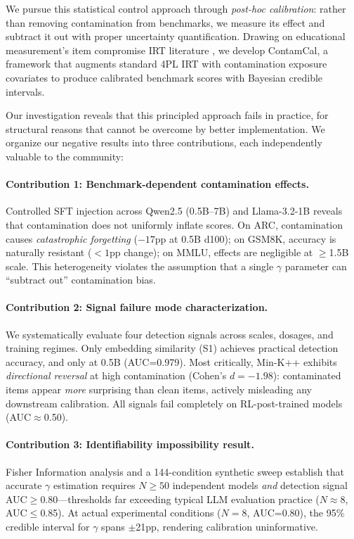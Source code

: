 \documentclass[11pt,a4paper]{article}
\begin{document}
We pursue this statistical control approach through \emph{post-hoc calibration}: rather than removing contamination from benchmarks, we measure its effect and subtract it out with proper uncertainty quantification.
Drawing on educational measurement's item compromise IRT literature \cite{eckerly2017detecting,sinharay2017assessing}, we develop ContamCal, a framework that augments standard 4PL IRT with contamination exposure covariates to produce calibrated benchmark scores with Bayesian credible intervals.

Our investigation reveals that this principled approach fails in practice, for structural reasons that cannot be overcome by better implementation.
We organize our negative results into three contributions, each independently valuable to the community:

\paragraph{Contribution 1: Benchmark-dependent contamination effects.}
Controlled SFT injection across Qwen2.5 (0.5B--7B) and Llama-3.2-1B reveals that contamination does not uniformly inflate scores.
On ARC, contamination causes \emph{catastrophic forgetting} ($-17$pp at 0.5B d100); on GSM8K, accuracy is naturally resistant ($<1$pp change); on MMLU, effects are negligible at $\geq$1.5B scale.
This heterogeneity violates the assumption that a single $\gamma$ parameter can ``subtract out'' contamination bias.

\paragraph{Contribution 2: Signal failure mode characterization.}
We systematically evaluate four detection signals across scales, dosages, and training regimes.
Only embedding similarity (S1) achieves practical detection accuracy, and only at 0.5B (AUC=0.979).
Most critically, Min-K++ exhibits \emph{directional reversal} at high contamination (Cohen's $d=-1.98$): contaminated items appear \emph{more} surprising than clean items, actively misleading any downstream calibration.
All signals fail completely on RL-post-trained models (AUC$\approx$0.50).

\paragraph{Contribution 3: Identifiability impossibility result.}
Fisher Information analysis and a 144-condition synthetic sweep establish that accurate $\gamma$ estimation requires $N\geq50$ independent models \emph{and} detection signal AUC$\geq$0.80---thresholds far exceeding typical LLM evaluation practice ($N\approx8$, AUC$\leq$0.85).
At actual experimental conditions ($N=8$, AUC=0.80), the 95\% credible interval for $\gamma$ spans $\pm$21pp, rendering calibration uninformative.
\end{document}
